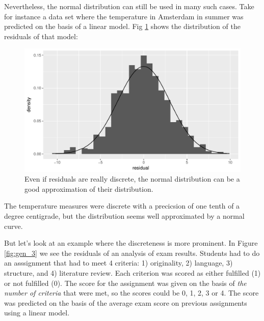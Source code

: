 \documentclass[]{report}\usepackage[]{graphicx}\usepackage[]{color}
\makeatletter
\def\maxwidth{ %
  \ifdim\Gin@nat@width>\linewidth
    \linewidth
  \else
    \Gin@nat@width
  \fi
}
\newenvironment{knitrout}{}{} %
\makeatother
\begin{document}
Nevertheless, the normal distribution can still be used in many such cases. Take for instance a data set where the temperature in Amsterdam in summer was predicted on the basis of a linear model. Fig \ref{fig:gen_2} shows the distribution of the residuals of that model:
% 
\begin{knitrout}
\color{fgcolor}\begin{figure}

{\centering \includegraphics[width=\maxwidth]{figure/gen_2-1} 

}

\caption[Even if residuals are really discrete, the normal distribution can be a good approximation of their distribution]{Even if residuals are really discrete, the normal distribution can be a good approximation of their distribution.}\label{fig:gen_2}
\end{figure}


\end{knitrout}


The temperature measures were discrete with a precicsion of one tenth of a degree centigrade, but the distribution seems well approximated by a normal curve.


But let's look at an example where the discreteness is more prominent. In Figure \ref{fig:gen_3} we see the residuals of an analysis of exam results. Students had to do an asssignment that had to meet 4 criteria: 1) originality, 2) language, 3) structure, and 4) literature review. Each criterion was scored as either fulfilled (1) or not fulfilled (0). The score for the assignment was given on the basis of \textit{the number of criteria} that were met, so the scores could be 0, 1, 2, 3 or 4. The score was predicted on the basis of the average exam score on previous assignments using a linear model.
\end{document}
